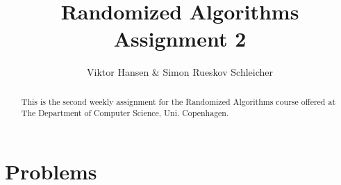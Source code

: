 \documentclass[12pt]{article}
\begin{document}
\nocite{*}


\title{Randomized Algorithms \\
       Assignment 2}

\author{Viktor Hansen \& Simon Rueskov Schleicher}

\maketitle

\begin{abstract}
  This is the second weekly assignment for the Randomized Algorithms course offered at The Department of Computer Science, Uni. Copenhagen.
\end{abstract}

\pagebreak

\section*{Problems}
\end{document}
